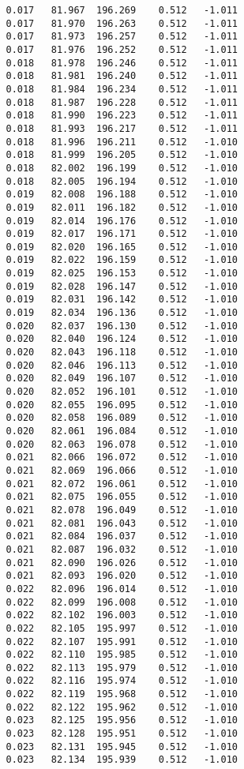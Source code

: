 \begin{verbatim}
   0.017   81.967  196.269    0.512   -1.011
   0.017   81.970  196.263    0.512   -1.011
   0.017   81.973  196.257    0.512   -1.011
   0.017   81.976  196.252    0.512   -1.011
   0.018   81.978  196.246    0.512   -1.011
   0.018   81.981  196.240    0.512   -1.011
   0.018   81.984  196.234    0.512   -1.011
   0.018   81.987  196.228    0.512   -1.011
   0.018   81.990  196.223    0.512   -1.011
   0.018   81.993  196.217    0.512   -1.011
   0.018   81.996  196.211    0.512   -1.010
   0.018   81.999  196.205    0.512   -1.010
   0.018   82.002  196.199    0.512   -1.010
   0.018   82.005  196.194    0.512   -1.010
   0.019   82.008  196.188    0.512   -1.010
   0.019   82.011  196.182    0.512   -1.010
   0.019   82.014  196.176    0.512   -1.010
   0.019   82.017  196.171    0.512   -1.010
   0.019   82.020  196.165    0.512   -1.010
   0.019   82.022  196.159    0.512   -1.010
   0.019   82.025  196.153    0.512   -1.010
   0.019   82.028  196.147    0.512   -1.010
   0.019   82.031  196.142    0.512   -1.010
   0.019   82.034  196.136    0.512   -1.010
   0.020   82.037  196.130    0.512   -1.010
   0.020   82.040  196.124    0.512   -1.010
   0.020   82.043  196.118    0.512   -1.010
   0.020   82.046  196.113    0.512   -1.010
   0.020   82.049  196.107    0.512   -1.010
   0.020   82.052  196.101    0.512   -1.010
   0.020   82.055  196.095    0.512   -1.010
   0.020   82.058  196.089    0.512   -1.010
   0.020   82.061  196.084    0.512   -1.010
   0.020   82.063  196.078    0.512   -1.010
   0.021   82.066  196.072    0.512   -1.010
   0.021   82.069  196.066    0.512   -1.010
   0.021   82.072  196.061    0.512   -1.010
   0.021   82.075  196.055    0.512   -1.010
   0.021   82.078  196.049    0.512   -1.010
   0.021   82.081  196.043    0.512   -1.010
   0.021   82.084  196.037    0.512   -1.010
   0.021   82.087  196.032    0.512   -1.010
   0.021   82.090  196.026    0.512   -1.010
   0.021   82.093  196.020    0.512   -1.010
   0.022   82.096  196.014    0.512   -1.010
   0.022   82.099  196.008    0.512   -1.010
   0.022   82.102  196.003    0.512   -1.010
   0.022   82.105  195.997    0.512   -1.010
   0.022   82.107  195.991    0.512   -1.010
   0.022   82.110  195.985    0.512   -1.010
   0.022   82.113  195.979    0.512   -1.010
   0.022   82.116  195.974    0.512   -1.010
   0.022   82.119  195.968    0.512   -1.010
   0.022   82.122  195.962    0.512   -1.010
   0.023   82.125  195.956    0.512   -1.010
   0.023   82.128  195.951    0.512   -1.010
   0.023   82.131  195.945    0.512   -1.010
   0.023   82.134  195.939    0.512   -1.010

\end{verbatim}
